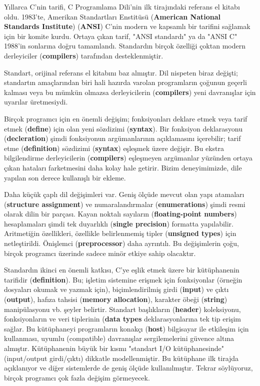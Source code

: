 \documentclass[a4paper,12pt,oneside]{book}
\begin{document}
\thispagestyle{introduction} \par Yıllarca C'nin tarifi, C Programlama Dili'nin ilk tirajındaki referans el kitabı oldu. 1983'te, Amerikan Standartları Enstitüsü (\textbf{American National Standards Institute}) (\textbf{ANSI}) C'nin modern ve kapsamlı bir tarifini sağlamak için bir komite kurdu. Ortaya çıkan tarif, "ANSI standardı" ya da "ANSI C" 1988'in sonlarına doğru tamamlandı. Standardın birçok özelliği çoktan modern derleyiciler (\textbf{compilers}) tarafından desteklenmiştir.
\par Standart, orijinal referans el kitabını baz almıştır. Dil nispeten biraz değişti; standartın amaçlarından biri hali hazırda varolan programların çoğunun geçerli kalması veya bu mümkün olmazsa derleyicilerin (\textbf{compilers}) yeni davranışlar için uyarılar üretmesiydi.
\par Birçok programcı için en önemli değişim; fonksiyonları  deklare etmek veya tarif etmek (\textbf{define}) için olan yeni sözdizimi (\textbf{syntax}). Bir fonksiyon deklarasyonu (\textbf{decleration}) şimdi fonksiyonun  argümanlarının  açıklamasını içerebilir; tarif etme (\textbf{definition}) sözdizimi (\textbf{syntax}) eşleşmek üzere değişir. Bu ekstra bilgilendirme derleyicilerin (\textbf{compilers}) eşleşmeyen argümanlar  yüzünden ortaya çıkan hataları farketmesini daha kolay hale getirir. Bizim deneyimimizde, dile yapılan son derece kullanışlı bir ekleme.
\par Daha küçük çaplı dil değişimleri var. Geniş ölçüde mevcut olan yapı atamaları (\textbf{structure assignment}) ve numaralandırmalar (\textbf{enumerations}) şimdi resmi olarak dilin bir parçası. Kayan noktalı sayıların (\textbf{floating-point numbers}) hesaplamaları şimdi tek duyarlıklı (\textbf{single precision}) formatta yapılabilir. Aritmetiğin özellikleri, özellikle belirlenmemiş tipler (\textbf{unsigned types}) için netleştirildi. Önişlemci (\textbf{preprocessor}) daha ayrıntılı. Bu değişimlerin çoğu, birçok programcı üzerinde sadece minör etkiye sahip olacaktır.
\par Standardın ikinci en önemli katkısı, C'ye eşlik etmek üzere bir kütüphanenin tarifidir (\textbf{definition}). Bu; işletim sistemine erişmek için fonksiyonlar  (örneğin dosyaları okumak ve yazmak için), biçimlendirilmiş girdi (\textbf{input}) ve çıktı (\textbf{output}), hafıza tahsisi (\textbf{memory allocation}), karakter öbeği (\textbf{string}) manipülasyonu vb. şeyler belirtir. Standart başlıkların (\textbf{header}) koleksiyonu, fonksiyonların  ve veri tiplerinin (\textbf{data types} deklarasyonlarına tek tip erişim sağlar. Bu kütüphaneyi programların konakçı (\textbf{host}) bilgisayar ile etkileşim için kullanması, uyumlu (compatible) davranışlar sergilemelerini güvence altına almıştır. Kütüphanenin büyük bir kısmı "standart I/O kütüphanesinde" (input/output girdi/çıktı) dikkatle modellenmiştir. Bu kütüphane ilk tirajda açıklanıyor ve diğer sistemlerde de geniş ölçüde kullanılmıştır. Tekrar söylüyoruz, birçok programcı çok fazla değişim görmeyecek.
\end{document}
